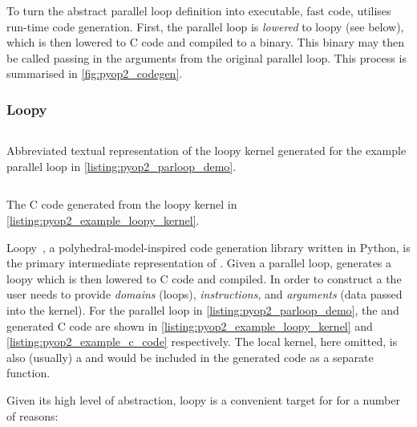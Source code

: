 \documentclass[thesis]{subfiles}
\begin{document}
To turn the abstract parallel loop definition into executable, fast code,  utilises run-time code generation.
First, the parallel loop is \emph{lowered} to loopy (see below), which is then lowered to C code and compiled to a binary.
This binary may then be called passing in the arguments from the original parallel loop.
This process is summarised in \cref{fig:pyop2_codegen}.

\subsubsection{Loopy}

\begin{listing}
  \centering
  \begin{minipage}{.9\textwidth}
    \inputminted{text}{./scripts/artefacts/pyop2_example_loopy_kernel_tidy.txt}
  \end{minipage}
  \caption{
    Abbreviated textual representation of the loopy kernel generated for the example parallel loop in \cref{listing:pyop2_parloop_demo}.
  }
  \label{listing:pyop2_example_loopy_kernel}
\end{listing}

\begin{listing}
  \centering
  \begin{minipage}{.9\textwidth}
    \inputminted{c}{./scripts/artefacts/pyop2_example_c_code_tidy.c}
  \end{minipage}
  \caption{
    The C code generated from the loopy kernel in \cref{listing:pyop2_example_loopy_kernel}.
  }
  \label{listing:pyop2_example_c_code}
\end{listing}

Loopy~\cite{klocknerLooPyTransformationbased2014}, a polyhedral-model-inspired code generation library written in Python, is the primary intermediate representation of .
Given a parallel loop,  generates a loopy  which is then lowered to C code and compiled.
In order to construct a  the user needs to provide \emph{domains} (loops), \emph{instructions}, and \emph{arguments} (data passed into the kernel).
For the parallel loop in \cref{listing:pyop2_parloop_demo}, the  and generated C code are shown in \cref{listing:pyop2_example_loopy_kernel} and \cref{listing:pyop2_example_c_code} respectively.
The local kernel, here omitted, is also (usually) a  and would be included in the generated code as a separate function.

Given its high level of abstraction, loopy is a convenient target for  for a number of reasons:
\end{document}
